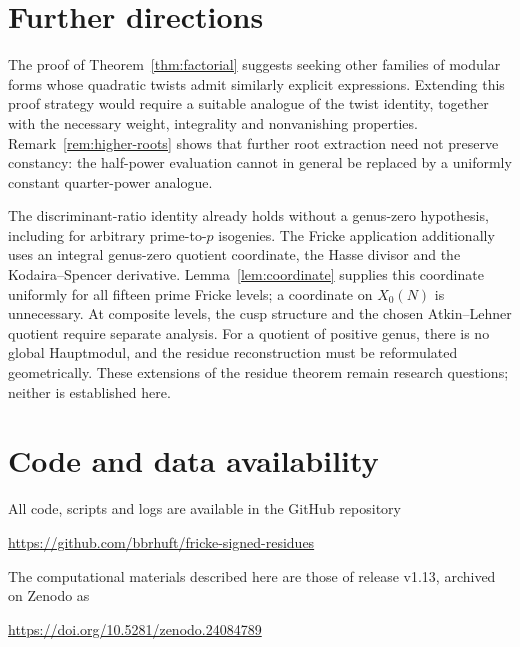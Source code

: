 \documentclass[11pt,a4paper]{article}
\numberwithin{equation}{section}
\theoremstyle{definition}
\theoremstyle{remark}
\begin{document}
\section{Further directions}
The proof of Theorem~\ref{thm:factorial} suggests seeking other families
of modular forms whose quadratic twists admit similarly explicit
expressions. Extending this proof strategy would require a suitable
analogue of the twist identity, together with the necessary weight,
integrality and nonvanishing properties.
Remark~\ref{rem:higher-roots} shows that further root extraction need
not preserve constancy: the half-power evaluation cannot in general
be replaced by a uniformly constant quarter-power analogue.

The discriminant-ratio identity already holds without a genus-zero
hypothesis, including for arbitrary prime-to-$p$ isogenies. The Fricke
application additionally uses an integral genus-zero quotient coordinate,
the Hasse divisor and the Kodaira--Spencer derivative.
Lemma~\ref{lem:coordinate} supplies this coordinate uniformly for all
fifteen prime Fricke levels; a coordinate on $X_0(N)$ is unnecessary.
At composite levels, the cusp structure and the chosen Atkin--Lehner
quotient require separate analysis. For a quotient of positive genus,
there is no global Hauptmodul, and the residue reconstruction must be
reformulated geometrically. These extensions of the residue theorem
remain research questions; neither is established here.


\section*{Code and data availability}
All code, scripts and logs are available in the GitHub repository
\begin{center}\url{https://github.com/bbrhuft/fricke-signed-residues}\end{center}
The computational materials described here are those of release v1.13, archived on Zenodo as
\begin{center}\href{https://doi.org/10.5281/zenodo.24084789}{https://doi.org/10.5281/zenodo.24084789}\end{center}
\end{document}
